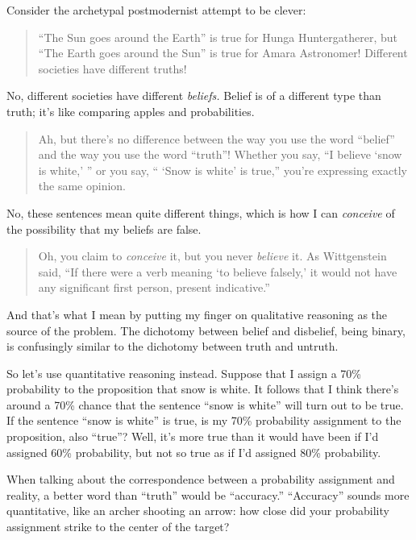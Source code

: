 {
 Consider the archetypal postmodernist attempt to be clever:}

\begin{quote}
{
 ``The Sun goes around the
Earth'' is true for Hunga Huntergatherer, but
``The Earth goes around the Sun'' is
true for Amara Astronomer! Different societies have different truths!}
\end{quote}

{
 No, different societies have different \textit{beliefs.} Belief is
of a different type than truth; it's like comparing
apples and probabilities.}

\begin{quote}
{
 Ah, but there's no difference between the way you
use the word ``belief'' and the way
you use the word ``truth''! Whether
you say, ``I believe `snow is
white,' '' or you say,
`` `Snow is white' is
true,'' you're expressing exactly the
same opinion.}
\end{quote}

{
 No, these sentences mean quite different things, which is how I
can \textit{conceive} of the possibility that my beliefs are false.}

\begin{quote}
{
 Oh, you claim to \textit{conceive} it, but you never
\textit{believe} it. As Wittgenstein said, ``If there
were a verb meaning `to believe
falsely,' it would not have any significant first
person, present indicative.''}
\end{quote}

{
 And that's what I mean by putting my finger on
qualitative reasoning as the source of the problem. The dichotomy
between belief and disbelief, being binary, is confusingly similar to
the dichotomy between truth and untruth.}

{
 So let's use quantitative reasoning instead.
Suppose that I assign a 70\% probability to the proposition that snow
is white. It follows that I think there's around a 70\%
chance that the sentence ``snow is
white'' will turn out to be true. If the sentence
``snow is white'' is true, is my
70\% probability assignment to the proposition, also
``true''? Well, it's
more true than it would have been if I'd assigned 60\%
probability, but not so true as if I'd assigned 80\%
probability.}

{
 When talking about the correspondence between a probability
assignment and reality, a better word than
``truth'' would be
``accuracy.''
``Accuracy'' sounds more
quantitative, like an archer shooting an arrow: how close did your
probability assignment strike to the center of the target?}

